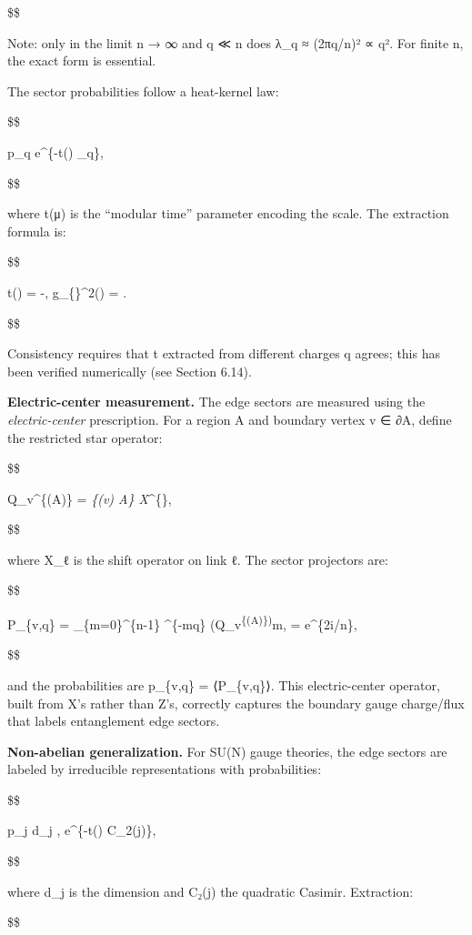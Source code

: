 \documentclass[11pt,a4paper]{article}
\theoremstyle{remark}
\begin{document}
\$\$

Note: only in the limit n → ∞ and q ≪ n does λ\_q ≈
(2πq/n)² ∝ q². For finite n, the exact form is essential.

The sector probabilities follow a heat-kernel law:

\$\$

p\_q \propto e\^{}\{-t(\mu) \lambda\_q\},

\$\$

where t(μ) is the ``modular time'' parameter encoding the scale. The
extraction formula is:

\$\$

t(\mu) = -, \qquad
g\_\{\}\^{}2(\mu) = .

\$\$

Consistency requires that t extracted from different charges q agrees;
this has been verified numerically (see Section 6.14).

\textbf{Electric-center measurement.} The edge sectors are measured using the
\emph{electric-center} prescription. For a region A and boundary vertex
v ∈ ∂A, define the restricted star operator:

\$\$

Q\_v\^{}\{(A)\} = \prod\emph{\{\ell \in {}(v) \cap A\} X}\ell\^{}\{\},

\$\$

where X\_ℓ is the shift operator on link ℓ. The sector projectors are:

\$\$

P\_\{v,q\} =  \sum\_\{m=0\}\^{}\{n-1\} \omega\^{}\{-mq\} \left(Q\_v\textsuperscript{\{(A)\}\right)}m,
\qquad \omega = e\^{}\{2\pi i/n\},

\$\$

and the probabilities are p\_\{v,q\} = ⟨P\_\{v,q\}⟩. This
electric-center operator, built from X's rather than Z's, correctly
captures the boundary gauge charge/flux that labels entanglement edge sectors.

\textbf{Non-abelian generalization.} For SU(N) gauge theories, the edge
sectors are labeled by irreducible representations with probabilities:

\$\$

p\_j \propto d\_j , e\^{}\{-t(\mu) C\_2(j)\},

\$\$

where d\_j is the dimension and C₂(j) the quadratic Casimir. Extraction:

\$\$
\end{document}
